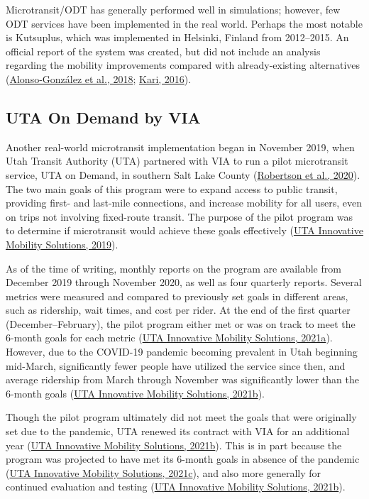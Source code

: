 \documentclass[
]{report}
\begin{document}
Microtransit/ODT has generally performed well in simulations; however, few ODT services have been implemented in the real world. Perhaps the most notable is Kutsuplus, which was implemented in Helsinki, Finland from 2012--2015. An official report of the system was created, but did not include an analysis regarding the mobility improvements compared with already-existing alternatives (\protect\hyperlink{ref-Alonso-Gonzalez2018}{Alonso-González et al., 2018}; \protect\hyperlink{ref-Kari2016}{Kari, 2016}).

\hypertarget{uta-on-demand-by-via}{%
\subsection{UTA On Demand by VIA}\label{uta-on-demand-by-via}}

Another real-world microtransit implementation began in November 2019, when Utah Transit Authority (UTA) partnered with VIA to run a pilot microtransit service, UTA on Demand, in southern Salt Lake County (\protect\hyperlink{ref-UTAreport}{Robertson et al., 2020}). The two main goals of this program were to expand access to public transit, providing first- and last-mile connections, and increase mobility for all users, even on trips not involving fixed-route transit. The purpose of the pilot program was to determine if microtransit would achieve these goals effectively (\protect\hyperlink{ref-UTAevalDEC}{UTA Innovative Mobility Solutions, 2019}).

As of the time of writing, monthly reports on the program are available from December 2019 through November 2020, as well as four quarterly reports. Several metrics were measured and compared to previously set goals in different areas, such as ridership, wait times, and cost per rider. At the end of the first quarter (December--February), the pilot program either met or was on track to meet the 6-month goals for each metric (\protect\hyperlink{ref-UTAevalQ1}{UTA Innovative Mobility Solutions, 2021a}). However, due to the COVID-19 pandemic becoming prevalent in Utah beginning mid-March, significantly fewer people have utilized the service since then, and average ridership from March through November was significantly lower than the 6-month goals (\protect\hyperlink{ref-UTAevalQ3}{UTA Innovative Mobility Solutions, 2021b}).

Though the pilot program ultimately did not meet the goals that were originally set due to the pandemic, UTA renewed its contract with VIA for an additional year (\protect\hyperlink{ref-UTAevalQ3}{UTA Innovative Mobility Solutions, 2021b}). This is in part because the program was projected to have met its 6-month goals in absence of the pandemic (\protect\hyperlink{ref-UTAevalQ2}{UTA Innovative Mobility Solutions, 2021c}), and also more generally for continued evaluation and testing (\protect\hyperlink{ref-UTAevalQ3}{UTA Innovative Mobility Solutions, 2021b}).
\end{document}
